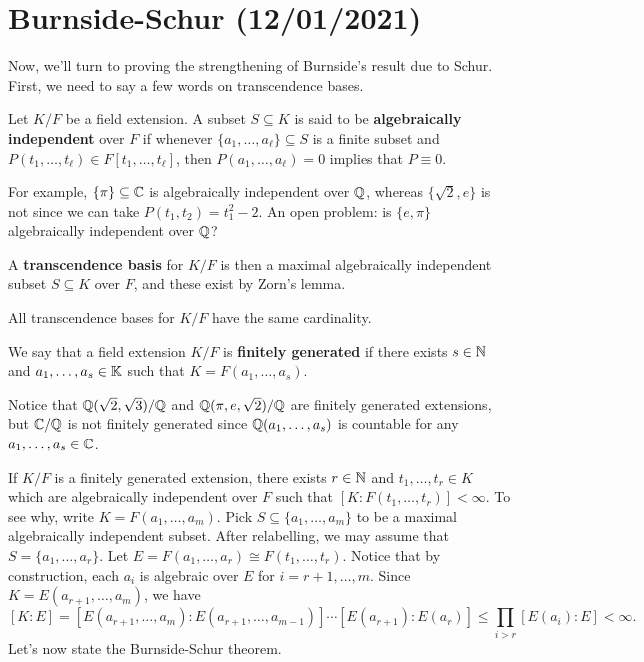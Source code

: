 \section{Burnside-Schur (12/01/2021)}
Now, we'll turn to proving the strengthening of Burnside's result 
due to Schur. First, we need to say a few words on transcendence bases. 

Let $K/F$ be a field extension. A subset $S \subseteq K$ is said to be 
{\bf algebraically independent} over $F$ if whenever $\{a_1, \dots, a_\ell\} 
\subseteq S$ is a finite subset and $P(t_1, \dots, t_\ell) \in 
F[t_1, \dots, t_\ell]$, then $P(a_1, \dots, a_\ell) = 0$ implies that 
$P \equiv 0$. 

For example, $\{\pi\} \subseteq \mathbb{C}$ is algebraically independent over $\mathbb{Q}$, 
whereas $\{\sqrt 2, e\}$ is not since we can take $P(t_1, t_2) = t_1^2 - 2$. 
An open problem: is $\{e, \pi\}$ algebraically independent over $\mathbb{Q}$? 

A {\bf transcendence basis} for $K/F$ is then a maximal algebraically 
independent subset $S \subseteq K$ over $F$, and these exist by Zorn's lemma. 

\begin{exercise}{}
    All transcendence bases for $K/F$ have the same cardinality.
\end{exercise}

We say that a field extension $K/F$ is {\bf finitely generated} if 
there exists $s \in \mathbb{N}$ and $a_1, \dots, a_s \in \mathbb{K}$ such that 
$K = F(a_1, \dots, a_s)$. 

Notice that $\mathbb{Q}(\sqrt 2, \sqrt 3)/\mathbb{Q}$ and $\mathbb{Q}(\pi, e, \sqrt 2)/\mathbb{Q}$ 
are finitely generated extensions, but $\mathbb{C}/\mathbb{Q}$ is not finitely generated since 
$\mathbb{Q}(a_1, \dots, a_s)$ is countable for any $a_1, \dots, a_s \in \mathbb{C}$. 

If $K/F$ is a finitely generated extension, there exists $r \in \mathbb{N}$ and 
$t_1, \dots, t_r \in K$ which are algebraically independent over $F$ 
such that $[K : F(t_1, \dots, t_r)] < \infty$. To see why, 
write $K = F(a_1, \dots, a_m)$. Pick $S \subseteq \{a_1, \dots, a_m\}$ 
to be a maximal algebraically independent subset. After relabelling, we 
may assume that $S = \{a_1, \dots, a_r\}$. Let $E = F(a_1, \dots, a_r) 
\cong F(t_1, \dots, t_r)$. Notice that by construction, each 
$a_i$ is algebraic over $E$ for $i = r+1, \dots, m$. Since 
$K = E(a_{r+1}, \dots, a_m)$, we have 
\[ [K : E] = [E(a_{r+1}, \dots, a_m) : E(a_{r+1}, \dots, a_{m-1})] 
\cdots [E(a_{r+1}) : E(a_r)] \leq \prod_{i>r} [E(a_i) : E] < \infty. \] 
Let's now state the Burnside-Schur theorem. 


